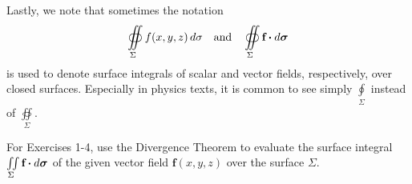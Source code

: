 Lastly, we note that sometimes the notation
\begin{displaymath}
 \oiint\limits_{\Sigma} f(x,y,z)\,d\sigma \quad\text{and}\quad \oiint\limits_{\Sigma} \textbf{f} \bm{\cdot} d\bm{\sigma}
\end{displaymath}
is used to denote surface integrals of scalar and vector fields, respectively, over closed
surfaces.\index{$\oiint\limits_{\Sigma}$} Especially in physics texts, it is common to see simply
$\oint\limits_{\Sigma}$ instead of $\oiint\limits_{\Sigma}$.

\startexercises\label{sec4dot4}
\par\noindent For Exercises 1-4, use the Divergence Theorem to evaluate the surface integral
$\iint\limits_{\Sigma} \textbf{f} \bm{\cdot} d\bm{\sigma}$ of the given vector field $\textbf{f}(x,y,z)$ over the
surface $\Sigma$.

